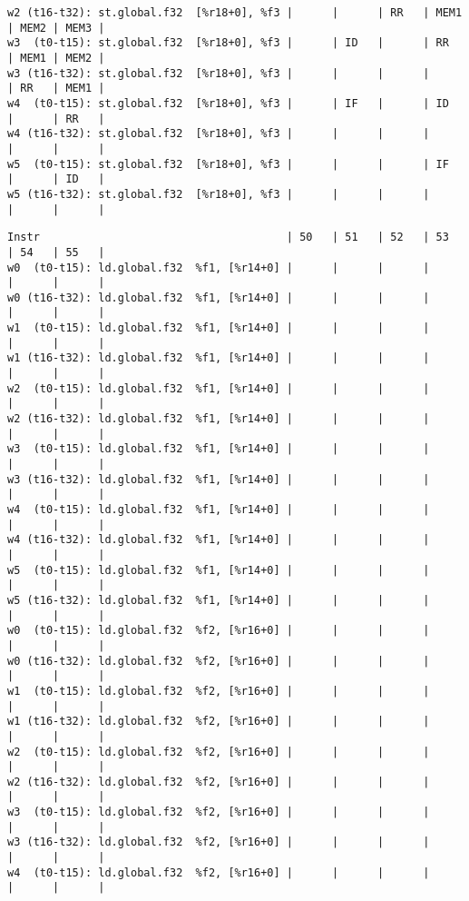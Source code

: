 \documentclass[11pt]{article}
\begin{document}
\begin{Answer}
\begin{verbatim}
w2 (t16-t32): st.global.f32  [%r18+0], %f3 |      |      | RR   | MEM1 | MEM2 | MEM3 |
w3  (t0-t15): st.global.f32  [%r18+0], %f3 |      | ID   |      | RR   | MEM1 | MEM2 |
w3 (t16-t32): st.global.f32  [%r18+0], %f3 |      |      |      |      | RR   | MEM1 |
w4  (t0-t15): st.global.f32  [%r18+0], %f3 |      | IF   |      | ID   |      | RR   |
w4 (t16-t32): st.global.f32  [%r18+0], %f3 |      |      |      |      |      |      |
w5  (t0-t15): st.global.f32  [%r18+0], %f3 |      |      |      | IF   |      | ID   |
w5 (t16-t32): st.global.f32  [%r18+0], %f3 |      |      |      |      |      |      |
\end{verbatim}
	\newpage
	\begin{verbatim}
Instr                                      | 50   | 51   | 52   | 53   | 54   | 55   |
w0  (t0-t15): ld.global.f32  %f1, [%r14+0] |      |      |      |      |      |      |
w0 (t16-t32): ld.global.f32  %f1, [%r14+0] |      |      |      |      |      |      |
w1  (t0-t15): ld.global.f32  %f1, [%r14+0] |      |      |      |      |      |      |
w1 (t16-t32): ld.global.f32  %f1, [%r14+0] |      |      |      |      |      |      |
w2  (t0-t15): ld.global.f32  %f1, [%r14+0] |      |      |      |      |      |      |
w2 (t16-t32): ld.global.f32  %f1, [%r14+0] |      |      |      |      |      |      |
w3  (t0-t15): ld.global.f32  %f1, [%r14+0] |      |      |      |      |      |      |
w3 (t16-t32): ld.global.f32  %f1, [%r14+0] |      |      |      |      |      |      |
w4  (t0-t15): ld.global.f32  %f1, [%r14+0] |      |      |      |      |      |      |
w4 (t16-t32): ld.global.f32  %f1, [%r14+0] |      |      |      |      |      |      |
w5  (t0-t15): ld.global.f32  %f1, [%r14+0] |      |      |      |      |      |      |
w5 (t16-t32): ld.global.f32  %f1, [%r14+0] |      |      |      |      |      |      |
w0  (t0-t15): ld.global.f32  %f2, [%r16+0] |      |      |      |      |      |      |
w0 (t16-t32): ld.global.f32  %f2, [%r16+0] |      |      |      |      |      |      |
w1  (t0-t15): ld.global.f32  %f2, [%r16+0] |      |      |      |      |      |      |
w1 (t16-t32): ld.global.f32  %f2, [%r16+0] |      |      |      |      |      |      |
w2  (t0-t15): ld.global.f32  %f2, [%r16+0] |      |      |      |      |      |      |
w2 (t16-t32): ld.global.f32  %f2, [%r16+0] |      |      |      |      |      |      |
w3  (t0-t15): ld.global.f32  %f2, [%r16+0] |      |      |      |      |      |      |
w3 (t16-t32): ld.global.f32  %f2, [%r16+0] |      |      |      |      |      |      |
w4  (t0-t15): ld.global.f32  %f2, [%r16+0] |      |      |      |      |      |      |

\end{verbatim}
\end{Answer}
\end{document}
